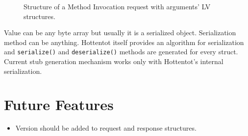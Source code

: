 \documentclass[10pt,a4paper]{article}
\begin{document}
\begin{figure}[!ht]
  \caption{Structure of a Method Invocation request with arguments' LV structures.}
  \centering
\end{figure}

Value can be any byte array but usually it is a serialized object. Serialization method can be anything. Hottentot itself provides an algorithm for serialization and \texttt {serialize()} and \texttt {deserialize()} methods are generated for every struct. Current stub generation mechanism works only with Hottentot's internal serialization.

\section {Future Features}
\begin{itemize}
  \item Version should be added to request and response structures.
\end{itemize}
\end{document}
